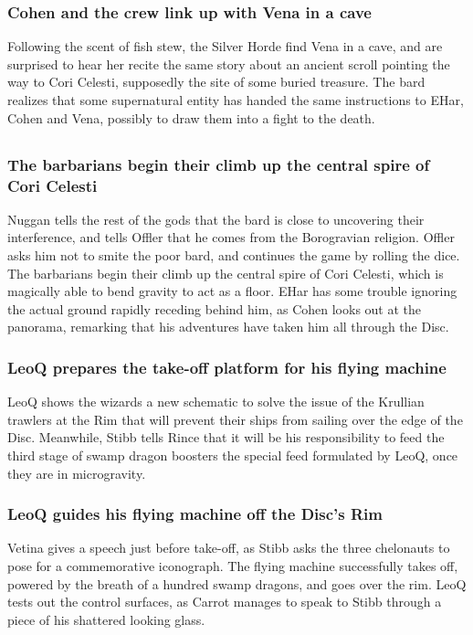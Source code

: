 \subsubsection{\Gls{Cohen} and the crew link up with \Gls{Vena} in a cave}
Following the scent of fish stew, the Silver Horde find \Gls{Vena} in a cave, and are surprised to
hear her recite the same story about an ancient scroll pointing the way to Cori Celesti, supposedly
the site of some buried treasure. The bard realizes that some supernatural entity has handed the
same instructions to \Gls{EHar}, \Gls{Cohen} and \Gls{Vena}, possibly to draw them into a fight to
the death.

\subsection{}
\subsubsection{The barbarians begin their climb up the central spire of Cori Celesti}
\Gls{Nuggan} tells the rest of the gods that the bard is close to uncovering their interference, and
tells \Gls{Offler} that he comes from the Borogravian religion. \Gls{Offler} asks him not to smite
the poor bard, and continues the game by rolling the dice. The barbarians begin their climb up the
central spire of Cori Celesti, which is magically able to bend gravity to act as a floor. \Gls{EHar}
has some trouble ignoring the actual ground rapidly receding behind him, as \Gls{Cohen} looks out
at the panorama, remarking that his adventures have taken him all through the Disc.

\subsubsection{\Gls{LeoQ} prepares the take-off platform for his flying machine}
\Gls{LeoQ} shows the wizards a new schematic to solve the issue of the Krullian trawlers at the
Rim that will prevent their ships from sailing over the edge of the Disc. Meanwhile, \Gls{Stibb}
tells \Gls{Rince} that it will be his responsibility to feed the third stage of swamp dragon
boosters the special feed formulated by \Gls{LeoQ}, once they are in microgravity.

\subsubsection{\Gls{LeoQ} guides his flying machine off the Disc's Rim}
\Gls{Vetina} gives a speech just before take-off, as \Gls{Stibb} asks the three chelonauts to pose
for a commemorative iconograph. The flying machine successfully takes off, powered by the breath
of a hundred swamp dragons, and goes over the rim. \Gls{LeoQ} tests out the control surfaces, as
\Gls{Carrot} manages to speak to \Gls{Stibb} through a piece of his shattered looking glass.

